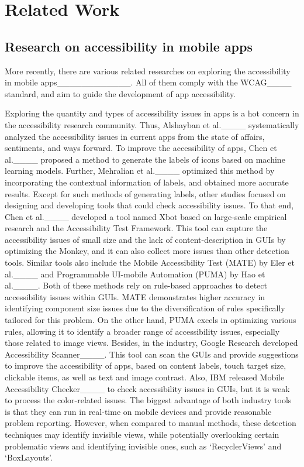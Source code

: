 \section{Related Work}
\label{sec: related work}

\subsection{Research on accessibility in mobile apps}\label{sub: research1}
More recently, there are various related researches on exploring the accessibility in mobile apps____________.
All of them comply with the WCAG____ standard, and aim to guide the development of app accessibility.

Exploring the quantity and types of accessibility issues in apps is a hot concern in the accessibility research community.
Thus, Alshayban et al.____ systematically analyzed the accessibility issues in current apps from the state of affairs, sentiments, and ways forward.
To improve the accessibility of apps, Chen et al.____ proposed a method to generate the labels of icons based on machine learning models.
Further, Mehralian et al.____ optimized this method by incorporating the contextual information of labels, and obtained more accurate results. 
Except for such methods of generating labels, other studies focused on designing and developing tools that could check accessibility issues. 
To that end, Chen et al.____ developed a tool named Xbot based on large-scale empirical research and the Accessibility Test Framework. 
This tool can capture the accessibility issues of small size and the lack of content-description in GUIs by optimizing the Monkey, and it can also collect more issues than other detection tools. 
Similar tools also include the Mobile Accessibility Test (MATE) by Eler et al.____ and Programmable UI-mobile Automation (PUMA) by Hao et al.____. 
Both of these methods rely on rule-based approaches to detect accessibility issues within GUIs. 
MATE demonstrates higher accuracy in identifying component size issues due to the diversification of rules specifically tailored for this problem. 
On the other hand, PUMA excels in optimizing various rules, allowing it to identify a broader range of accessibility issues, especially those related to image views. 
Besides, in the industry, Google Research developed Accessibility Scanner____.
This tool can scan the GUIs and provide suggestions to improve the accessibility of apps, based on content labels, touch target size, clickable items, as well as text and image contrast.
Also, IBM released Mobile Accessibility Checker____ to check accessibility issues in GUIs, but it is weak to process the color-related issues.
The biggest advantage of both industry tools is that they can run in real-time on mobile devices and provide reasonable problem reporting.
However, when compared to manual methods, these detection techniques may identify invisible views, while potentially overlooking certain problematic views and identifying invisible ones, such as `RecyclerViews' and `BoxLayouts'.

